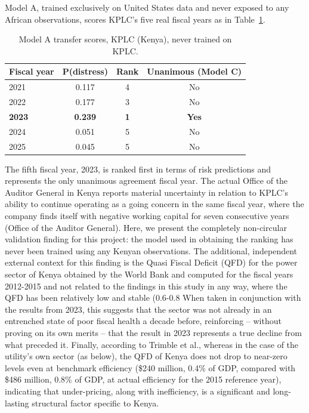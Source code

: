 \documentclass[final,1p,times]{elsarticle}
\begin{document}
Model A, trained exclusively on United States data and never exposed to any African observations, scores KPLC's five real fiscal years as in Table~\ref{tab:kplc}.

\begin{table}[h]
\centering
\small
\caption{Model A transfer scores, KPLC (Kenya), never trained on KPLC.}
\label{tab:kplc}
\begin{tabular}{lccc}
\toprule
\textbf{Fiscal year} & \textbf{P(distress)} & \textbf{Rank} & \textbf{Unanimous (Model C)} \\
\midrule
2021 & 0.117 & 4 & No \\
2022 & 0.177 & 3 & No \\
\textbf{2023} & \textbf{0.239} & \textbf{1} & \textbf{Yes} \\
2024 & 0.051 & 5 & No \\
2025 & 0.045 & 5 & No \\
\bottomrule
\end{tabular}
\end{table}

The fifth fiscal year, 2023, is ranked first in terms of risk predictions and represents the only unanimous agreement fiscal year. The actual Office of the Auditor General in Kenya reports material uncertainty in relation to KPLC's ability to continue operating as a going concern in the same fiscal year, where the company finds itself with negative working capital for seven consecutive years (Office of the Auditor General). Here, we present the completely non-circular validation finding for this project: the model used in obtaining the ranking has never been trained using any Kenyan observations. The additional, independent external context for this finding is the Quasi Fiscal Deficit (QFD) for the power sector of Kenya obtained by the World Bank and computed for the fiscal years 2012-2015 and not related to the findings in this study in any way, where the QFD has been relatively low and stable (0.6-0.8%
When taken in conjunction with the results from 2023, this suggests that the sector was not already in an entrenched state of poor fiscal health a decade before, reinforcing -- without proving on its own merits -- that the result in 2023 represents a true decline from what preceded it. Finally, according to Trimble et al., whereas in the case of the utility's own sector (as below), the QFD of Kenya does not drop to near-zero levels even at benchmark efficiency (\$240 million, 0.4\% of GDP, compared with \$486 million, 0.8\% of GDP, at actual efficiency for the 2015 reference year), indicating that under-pricing, along with inefficiency, is a significant and long-lasting structural factor specific to Kenya.
\end{document}
